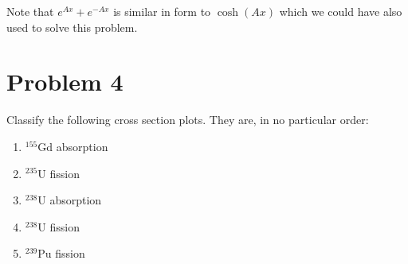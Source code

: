 \documentclass{report}
\begin{document}
Note that $e^{Ax} + e^{-Ax}$ is similar in form to $\cosh(Ax)$ which we could have also used to solve this problem.



\newpage
\section*{Problem 4}

Classify the following cross section plots. They are, in no particular order:
\begin{enumerate}[(1)]
\item $^{155}$Gd absorption
\item $^{235}$U fission
\item $^{238}$U absorption
\item $^{238}$U fission
\item $^{239}$Pu fission
\end{enumerate}
\end{document}
